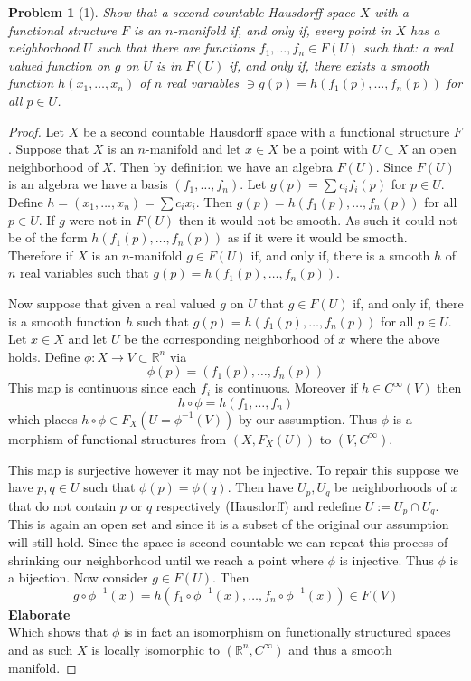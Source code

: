\documentclass[10pt]{article}
\newcommand{\bb}[1]{\mathbb{#1}}
\theoremstyle{plain}
\newtheorem{problem}{Problem}
\theoremstyle{remark}
\begin{document}
\begin{problem}[1]
  Show that a second countable Hausdorff space $X$ with a functional
  structure $F$ is an $n$-manifold if, and only if, every point in
  $X$ has a neighborhood $U$ such that there are functions
  $f_1,\ldots,f_n\in F(U)$ such that: a real valued function on $g$
  on $U$ is in $F(U)$ if, and only if, there exists a smooth function
  $h(x_1,\ldots,x_n)$ of $n$ real variables $\ni g(p)=h(f_1(p),\ldots,f_n(p))$
  for all $p\in U$.
\end{problem}

\begin{proof}
  Let $X$ be a second countable Hausdorff space with a functional
  structure $F$. Suppose that $X$ is an $n$-manifold and let
  $x\in X$ be a point with $U\subset X$ an open neighborhood of $X$.
  Then by definition we have an algebra $F(U)$. Since $F(U)$
  is an algebra we have a basis $(f_1,\ldots,f_n)$. Let
  $g(p)=\sum c_if_i(p)$ for $p\in U$. Define $h=(x_1,\ldots,x_n)=\sum c_ix_i$.
  Then $g(p)=h(f_1(p),\ldots,f_n(p))$ for all $p\in U$. If $g$ were
  not in $F(U)$ then it would not be smooth. As such it could
  not be of the form $h(f_1(p),\ldots,f_n(p))$ as if it were it
  would be smooth. Therefore if $X$ is an $n$-manifold
  $g\in F(U)$ if, and only if, there is a smooth $h$ of $n$ real
  variables such that $g(p)=h(f_1(p),\ldots,f_n(p))$. 

  Now suppose that given a real valued $g$ on $U$ that $g\in F(U)$
  if, and only if, there is a smooth function $h$ such that
  $g(p)=h(f_1(p),\ldots,f_n(p))$ for all $p\in U$. Let $x\in X$ and
  let $U$ be the corresponding neighborhood of $x$ where the
  above holds. Define $\phi:X\rightarrow V\subset\bb{R}^n$ via
  \[\phi(p)=(f_1(p),\ldots,f_n(p)) \]
  This map is continuous since each $f_i$ is continuous. Moreover
  if $h\in C^\infty(V)$ then
  \[ h\circ \phi=h(f_1,\ldots,f_n)\]
  which places $h\circ \phi\in F_X(U=\phi^{-1}(V))$ by our assumption. Thus
  $\phi$ is a morphism of functional structures from $(X,F_X(U))$
  to $(V,C^\infty)$.

  This map is surjective however it may not be injective. To repair this
  suppose we have $p,q\in U$ such that $\phi(p)=\phi(q)$. Then
  have $U_p,U_q$ be neighborhoods of $x$ that do not contain
  $p$ or $q$ respectively (Hausdorff) and redefine $U:=U_p\cap U_q$. This is
  again an open set and since it is a subset of the original our assumption
  will still hold. Since the space is second countable we can repeat this
  process of shrinking our neighborhood until we reach a point where
  $\phi$ is injective. Thus $\phi$ is a bijection. Now consider $g\in F(U)$.
  Then
  \[ g\circ\phi^{-1}(x)=h(f_1\circ\phi^{-1}(x),\ldots,f_n\circ \phi^{-1}(x)) \in F(V) \]
  \textbf{Elaborate}\\
  Which shows that $\phi$ is in fact an isomorphism on functionally
  structured spaces and as such $X$ is locally isomorphic to
  $(\bb{R}^n,C^\infty)$ and thus a smooth manifold.
\end{proof}
\end{document}
